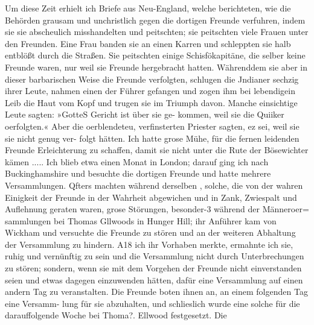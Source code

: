 Um diese Zeit erhielt ich Briefe aus Neu-England, welche
berichteten, wie die Behörden grausam und unchristlich gegen die
dortigen Freunde verfuhren, indem sie sie abscheulich misshandelten
und peitschten; sie peitschten viele Frauen unter den Freunden.
Eine Frau banden sie an einen Karren und schleppten sie 
halb entblößt durch die Straßen. Sie peitschten einige Schisfökapitäne,
die selber keine Freunde waren, nur weil sie Freunde hergebracht
hatten. Währenddem sie aber in dieser barbarischen Weise die
Freunde verfolgten, schlugen die Jndianer sechzig ihrer Leute,
nahmen einen der Führer gefangen und zogen ihm bei lebendigein
Leib die Haut vom Kopf und trugen sie im Triumph davon.
Manche einsichtige Leute sagten: »GotteS Gericht ist über sie ge-
kommen, weil sie die Quiiker oerfolgten.« Aber die oerblendeteu,
verfinsterten Priester sagten, ez sei, weil sie sie nicht genug ver-
folgt hätten. Ich hatte grose Mühe, für die fernen leidenden
Freunde Erleichterung zu schaffen, damit sie nicht unter die Rute
der Bösewichter kämen .....
Ich blieb etwa einen Monat in London; darauf ging ich
nach Buckinghamshire und besuchte die dortigen Freunde und
hatte mehrere Versammlungen. Qfters machten während derselben ,
solche, die von der wahren Einigkeit der Freunde in der Wahrheit
abgewichen und in Zank, Zwiespalt und Auflehnung geraten
waren, grose Störungen, besonder-3 während der Männeroer=
sammlungen bei Thomas Gllwoods in Hunger Hill; ihr Anführer
kam von Wickham und versuchte die Freunde zu stören und
an der weiteren Abhaltung der Versammlung zu hindern. A18
ich ihr Vorhaben merkte, ermahnte ich sie, ruhig und vernünftig
zu sein und die Versammlung nicht durch Unterbrechungen zu
stören; sondern, wenn sie mit dem Vorgehen der Freunde nicht
einverstanden seien und etwas dagegen einzuwenden hätten, dafür
eine Versammlung auf einen andern Tag zu veranstalten. Die
Freunde boten ihnen an, an einem folgenden Tag eine Versamm-
lung für sie abzuhalten, und schlieslich wurde eine solche für die
darauffolgende Woche bei Thoma?. Ellwood festgesetzt. Die


